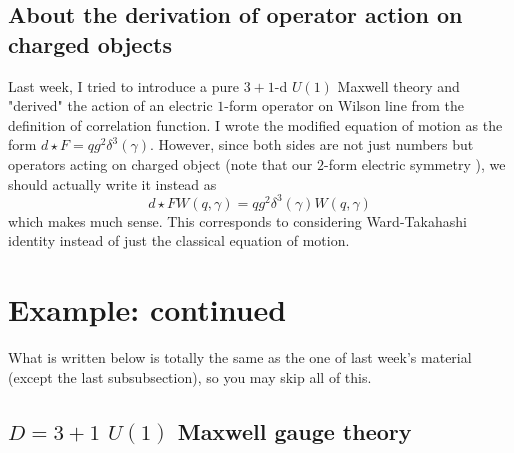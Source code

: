 \documentclass{ltjsarticle}
\theoremstyle{mystyle} %
\numberwithin{equation}{section}
\begin{document}
\subsection{About the derivation of operator action on charged objects}
Last week, I tried to introduce a pure $3+1$-d $U(1)$ Maxwell theory and "derived" the action of an electric $1$-form operator on Wilson line 
from the definition of correlation function. 
I wrote the modified equation of motion as the form 
$d\star F = qg^2 \delta^3(\gamma)$. 
However, since both sides are not just numbers but operators acting on charged object
(note that our $2$-form electric symmetry ), 
we should actually write it instead as 
$$d\star F W(q, \gamma)= qg^2 \delta^3(\gamma) W(q, \gamma)$$
which makes much sense. 
This corresponds to considering Ward-Takahashi identity instead of just the classical equation of motion. 
\newpage
\section{Example: continued}
What is written below is totally the same as the one of last week's material 
(except the last subsubsection), 
so you may skip all of this. 
\subsection{$D=3+1$ $U(1)$ Maxwell gauge theory}
\end{document}
